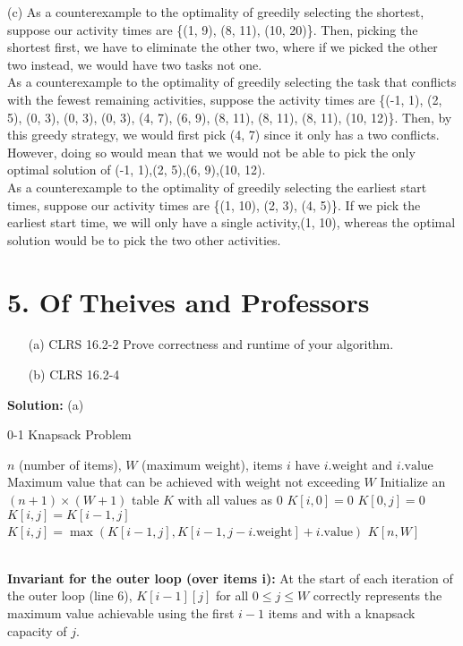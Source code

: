 \documentclass{article}
\begin{document}
(c)
As a counterexample to the optimality of greedily selecting the shortest, suppose our activity times are \{(1, 9), (8, 11), (10, 20)\}. Then, picking the shortest first, we have to eliminate the other two, where if we picked the other two instead, we would have two tasks not one.\\
As a counterexample to the optimality of greedily selecting the task that conflicts with the fewest remaining activities, suppose the activity times are \{(-1, 1), (2, 5), (0, 3), (0, 3), (0, 3), (4, 7), (6, 9), (8, 11), (8, 11), (8, 11), (10, 12)\}. Then, by this greedy strategy, we would first pick (4, 7) since it only has a two conflicts. However, doing so would mean that we would not be able to pick the only optimal solution of
(-1, 1),(2, 5),(6, 9),(10, 12).\\
As a counterexample to the optimality of greedily selecting the earliest start times, suppose our activity times are \{(1, 10), (2, 3), (4, 5)\}. If we pick the earliest start time, we will only have a single activity,(1, 10), whereas the optimal solution would be to pick the two other activities.\\
\section*{5. Of Theives and Professors}
\begin{enumerate}
    \item[(a)] CLRS 16.2-2 Prove correctness and runtime of your algorithm.
    \item[(b)] CLRS 16.2-4
\end{enumerate}
\textbf{Solution:}
(a)
\begin{algorithm}
\caption{0-1 Knapsack Problem}
\begin{algorithmic}[1]
\Require $n$ (number of items), $W$ (maximum weight), items $i$ have $i.\text{weight}$ and $i.\text{value}$
\Ensure Maximum value that can be achieved with weight not exceeding $W$
\State Initialize an $(n + 1) \times (W + 1)$ table $K$ with all values as $0$
    \State $K[i, 0] = 0$
\EndFor
{}
    \State $K[0, j] = 0$
\EndFor
{}
            \State $K[i, j] = K[i - 1, j]$
        \Else
            \State $K[i, j] = \max(K[i - 1, j], K[i - 1, j - i.\text{weight}] + i.\text{value})$
        \EndIf
    \EndFor
\EndFor
\State \Return $K[n, W]$
\end{algorithmic}
\end{algorithm}
\\
\textbf{Invariant for the outer loop (over items i):} At the start of each iteration of the outer loop (line 6), $K[i-1][j]$ for all $0 \leq j \leq W$ correctly represents the maximum value achievable using the first $i-1$ items and with a knapsack capacity of $j$. 
\end{document}
